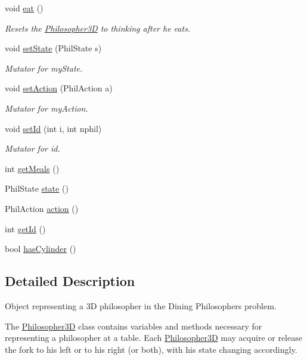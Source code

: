 \begin{DoxyCompactItemize}
void \hyperlink{class_philosopher3_d_a0fd066c61fec3adfdcd80eea1793fba7}{eat} ()
\begin{DoxyCompactList}\small\item\em Resets the \hyperlink{class_philosopher3_d}{Philosopher3D} to thinking after he eats. \end{DoxyCompactList}\item 
void \hyperlink{class_philosopher3_d_ad9c54065af476b716f985c0ae3d4bd21}{set\+State} (Phil\+State s)
\begin{DoxyCompactList}\small\item\em Mutator for my\+State. \end{DoxyCompactList}\item 
void \hyperlink{class_philosopher3_d_ab261853f450bfb3bcd25eb397893dba2}{set\+Action} (Phil\+Action a)
\begin{DoxyCompactList}\small\item\em Mutator for my\+Action. \end{DoxyCompactList}\item 
void \hyperlink{class_philosopher3_d_a748b557b785461ca3e1b3d44e658f9af}{set\+Id} (int i, int nphil)
\begin{DoxyCompactList}\small\item\em Mutator for id. \end{DoxyCompactList}\item 
int \hyperlink{class_philosopher3_d_a7bff098afeb987e4fe4fab2dd6adcad6}{get\+Meals} ()
\item 
Phil\+State \hyperlink{class_philosopher3_d_a515fb48855cd2a9421c13d6097953a10}{state} ()
\item 
Phil\+Action \hyperlink{class_philosopher3_d_a4dc5329e128f072695d216af3867b4b4}{action} ()
\item 
int \hyperlink{class_philosopher3_d_aa1b77e0ee22ef9eb661cbc83b90d163b}{get\+Id} ()
\item 
bool \hyperlink{class_philosopher3_d_a85edb411abaa49e0cc6fb8f8791bdb8b}{has\+Cylinder} ()
\end{DoxyCompactItemize}


\subsection{Detailed Description}
Object representing a 3D philosopher in the Dining Philosophers\textquotesingle{} problem. 

The \hyperlink{class_philosopher3_d}{Philosopher3D} class contains variables and methods necessary for representing a philosopher at a table. Each \hyperlink{class_philosopher3_d}{Philosopher3D} may acquire or release the fork to his left or to his right (or both), with his state changing accordingly. 

